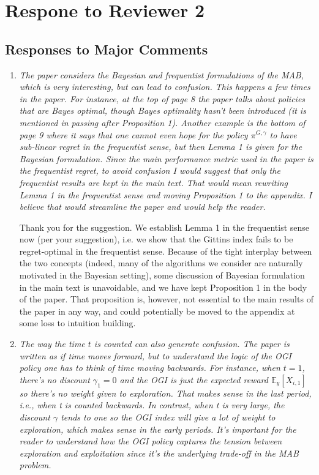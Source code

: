 \documentclass[11pt]{article}
\newcommand{\1}{\ensuremath{\mathbf{1}}} %
\theoremstyle{thm-sf}
\begin{document}
	\newpage
	\section{Respone to Reviewer 2}
	
	\subsection{Responses to Major Comments}
	
	\begin{enumerate}
		\item {\it The paper considers the Bayesian and frequentist formulations of the MAB, which is very interesting, but can lead to confusion. This happens a few times in the paper. For instance, at the top of page 8 the paper talks about policies that are Bayes optimal, though Bayes optimality hasn't been introduced (it is mentioned in passing after Proposition 1). Another example is the bottom of page 9 where it says that one cannot even hope for the policy $\pi^{G,\gamma}$ to have sub-linear regret in the frequentist sense, but then Lemma 1 is given for the Bayesian formulation. Since the main performance metric used in the paper is the frequentist regret, to avoid confusion I would suggest that only the frequentist results are kept in the main text. That would mean rewriting Lemma 1 in the frequentist sense and moving Proposition 1 to the appendix. I believe that would streamline the paper and would help the reader.}
		
		{
			
			Thank you for the suggestion. We establish Lemma 1 in the frequentist sense now (per your suggestion), i.e. we show that the Gittins index fails to be regret-optimal in the frequentist sense. Because of the tight interplay between the two concepts (indeed, many of the algorithms we consider are naturally motivated in the Bayesian setting), some discussion of Bayesian formulation in the main text is unavoidable, and we have kept Proposition 1 in the body of the paper. That proposition is, however, not essential to the main results of the paper in any way, and could potentially be moved to the appendix at some loss to intuition building. 
			
		}
		
		\item {\it The way the time $t$ is counted can also generate confusion. The paper is written as if time moves forward, but to understand the logic of the OGI policy one has to think of time moving backwards. For instance, when $t = 1$, there's no discount $\gamma_1 = 0$ and the OGI is just the expected reward $\mathbb E_y [X_{i,1}]$ so there's no weight given to exploration. That makes sense in the last period, i.e., when t is counted backwards. In contrast, when t is very large, the discount $\gamma$ tends to one so the OGI index will give a lot of weight to exploration, which makes sense in the early periods. It's important for the reader to understand how the OGI policy captures the tension between exploration and exploitation since it's the underlying trade-off in the MAB problem.
		}
	

\end{enumerate}
\end{document}
